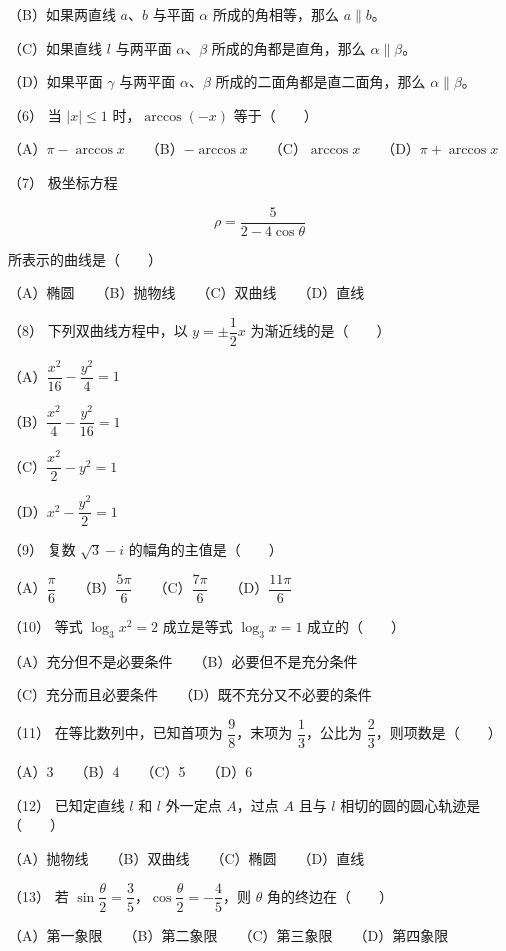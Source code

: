 \begin{answer}
（B）如果两直线 $a\text{、}b$ 与平面 $\alpha$ 所成的角相等，那么 $a\parallel b$。

（C）如果直线 $l$ 与两平面 $\alpha\text{、}\beta$ 所成的角都是直角，那么 $\alpha\parallel\beta$。

（D）如果平面 $\gamma$ 与两平面 $\alpha\text{、}\beta$ 所成的二面角都是直二面角，那么 $\alpha\parallel\beta$。

（6） 当 $|x|\le1$ 时，$\arccos(-x)$ 等于\mbox{（　　）}

（A）$\pi-\arccos x$　　（B）$-\arccos x$　　（C）$\arccos x$　　（D）$\pi+\arccos x$

（7） 极坐标方程

\nopagebreak[4]
\[
\rho=\frac5{2-4\cos\theta}
\]

所表示的曲线是\mbox{（　　）}

（A）椭圆　　（B）抛物线　　（C）双曲线　　（D）直线

（8） 下列双曲线方程中，以 $y=\pm\dfrac12x$ 为渐近线的是\mbox{（　　）}

（A）$\dfrac{x^2}{16}-\dfrac{y^2}{4}=1$

（B）$\dfrac{x^2}{4}-\dfrac{y^2}{16}=1$

（C）$\dfrac{x^2}{2}-y^2=1$

（D）$x^2-\dfrac{y^2}{2}=1$

（9） 复数 $\sqrt3-i$ 的幅角的主值是\mbox{（　　）}

（A）$\dfrac\pi6$　　（B）$\dfrac{5\pi}6$　　（C）$\dfrac{7\pi}6$　　（D）$\dfrac{11\pi}6$

（10） 等式 $\log_3x^2=2$ 成立是等式 $\log_3x=1$ 成立的\mbox{（　　）}

（A）充分但不是必要条件　　（B）必要但不是充分条件

（C）充分而且必要条件　　（D）既不充分又不必要的条件

（11） 在等比数列中，已知首项为 $\dfrac98$，末项为 $\dfrac13$，公比为 $\dfrac23$，则项数是\mbox{（　　）}

（A）3　　（B）4　　（C）5　　（D）6

（12） 已知定直线 $l$ 和 $l$ 外一定点 $A$，过点 $A$ 且与 $l$ 相切的圆的圆心轨迹是\mbox{（　　）}

（A）抛物线　　（B）双曲线　　（C）椭圆　　（D）直线

（13） 若 $\sin\dfrac\theta2=\dfrac35$，$\cos\dfrac\theta2=-\dfrac45$，则 $\theta$ 角的终边在\mbox{（　　）}

（A）第一象限　　（B）第二象限　　（C）第三象限　　（D）第四象限


\end{answer}
